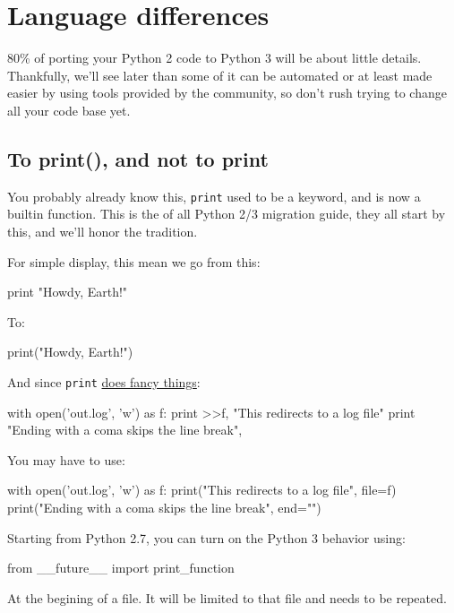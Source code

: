 
\chapter{Language differences}

80\% of porting your Python 2 code to Python 3 will be about little details. Thankfully, we'll see later than some of it can be automated or at least made easier by using tools provided by the community, so don't rush trying to change all your code base yet.

\section{To print(), and not to print}

You probably already know this, \lstinline{print} used to be a \gls{keyword}, and is now a builtin function. This is the  of all Python 2/3 migration guide, they all start by this, and we'll honor the tradition.

For simple display, this mean we go from this:

\begin{py2}
print "Howdy, Earth!"
\end{py2}

To:

\begin{py3}
print("Howdy, Earth!")
\end{py3}

And since \lstinline{print} \href{https://www.python.org/dev/peps/pep-0214/}{does fancy things}:

\begin{py2}
with open('out.log', 'w') as f:
    print >>f, "This redirects to a log file"
print "Ending with a coma skips the line break",
\end{py2}

You may have to use:

\begin{py3}
with open('out.log', 'w') as f:
    print("This redirects to a log file", file=f)
print("Ending with a coma skips the line break", end="")
\end{py3}

Starting from Python 2.7, you can turn on the Python 3 behavior using:

\begin{py2and3}
from __future__ import print_function
\end{py2and3}

At the begining of a file. It will be limited to that file and needs to be repeated.

